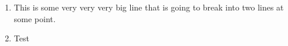 \documentclass{minimal}
\begin{document}
\begin{enumerate}
	\item This is some very very very big line that is going to break into two lines at some point.
	\item Test
\end{enumerate}
\end{document}
